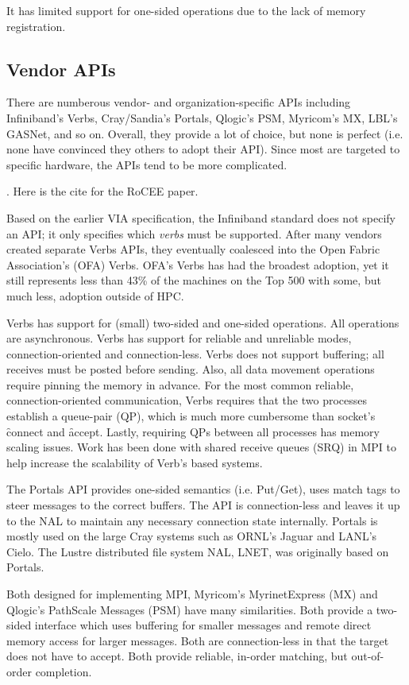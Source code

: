 It has limited support for one-sided operations due to the lack of
memory registration.

\subsection{Vendor APIs} There are numberous vendor- and organization-specific APIs
including Infiniband's Verbs\cite{ofa-verbs}, Cray/Sandia's Portals\cite{portals}, Qlogic's
PSM\cite{psm}, Myricom's MX\cite{mx}, LBL's GASNet\cite{gasnet}, and so on.  Overall, they
provide a lot of choice, but none is perfect (i.e. none have convinced they others to
adopt their API).  Since most are targeted to specific hardware, the APIs tend to be more
complicated.

.
Here is the cite for the RoCEE paper\cite{RoCEE}.

Based on the earlier VIA specification\cite{via}, the Infiniband standard does not specify
an API; it only specifies which \emph{verbs} must be supported. After many vendors created
separate Verbs APIs, they eventually coalesced into the Open Fabric Association's (OFA)
Verbs. OFA's Verbs has had the broadest adoption, yet it still represents less than 43\%
of the machines on the Top 500\cite{top500} with some, but much less, adoption outside of
HPC.

Verbs has support for (small) two-sided and one-sided operations. All operations are
asynchronous. Verbs has support for reliable and unreliable modes, connection-oriented
and connection-less. Verbs does not support buffering; all receives must be posted before
sending. Also, all data movement operations require pinning the memory in advance. For the
most common reliable, connection-oriented communication, Verbs requires that the two
processes establish a queue-pair (QP), which is much more cumbersome than socket's
\f{connect} and \f{accept}. Lastly, requiring QPs between all processes has memory scaling
issues. Work has been done with shared receive queues (SRQ) in MPI\cite{srq} to help
increase the scalability of Verb's based systems.

The Portals API provides one-sided semantics (i.e.  Put/Get), uses match tags to steer
messages to the correct buffers. The API is connection-less and leaves it up to the NAL to
maintain any necessary connection state internally. Portals is mostly used on the large
Cray systems such as ORNL's Jaguar\cite{jaguar} and LANL's Cielo\cite{cielo}.  The
Lustre distributed file system NAL, LNET, was originally based on Portals\cite{lnet}.

Both designed for implementing MPI, Myricom's MyrinetExpress (MX) and Qlogic's PathScale
Messages (PSM) have many similarities. Both provide a two-sided interface which uses
buffering for smaller messages and remote direct memory access for larger messages.  Both
are connection-less in that the target does not have to accept.  Both provide reliable,
in-order matching, but out-of-order completion.

